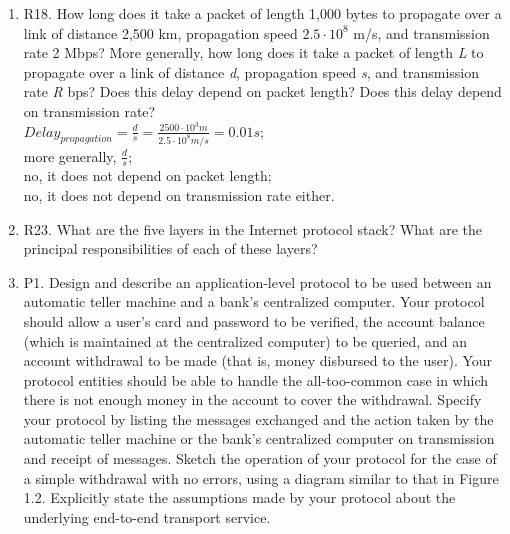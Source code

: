 \documentclass[12pt]{article}
\begin{document}
\begin{enumerate}
\item R18. How long does it take a packet of length 1,000 bytes to propagate over a link of distance 2,500 km, propagation speed \(2.5 \cdot10^8\) m/s, and transmission rate 2 Mbps? More generally, how long does it take a packet of length \textit{L} to propagate over a link of distance \textit{d}, propagation speed \textit{s}, and transmission rate \textit{R} bps? Does this delay depend on packet length? Does this delay depend on transmission rate?\\[1em]
\( Delay_{propagation} = \frac{d}{s}
= \frac{2500\cdot10^3m}{2.5\cdot10^8m/s}
=0.01s\);\\[0.25em] more generally, \(\frac{d}{s}\);\\[0.25em] no, it does not depend on packet length;\\ no, it does not depend on transmission rate either.
\item R23. What are the five layers in the Internet protocol stack? What are the principal responsibilities of each of these layers?
\begin{center}
\end{center}
\item P1. Design and describe an application-level protocol to be used between an automatic teller machine and a bank’s centralized computer. Your protocol should allow a user’s card and password to be verified, the account balance (which is maintained at the centralized computer) to be queried, and an account withdrawal to be made (that is, money disbursed to the user). Your protocol entities should be able to handle the all-too-common case in which there is not enough money in the account to cover the withdrawal. Specify your protocol by listing the messages exchanged and the action taken by the automatic teller machine or the bank’s centralized computer on transmission and receipt of messages. Sketch the operation of your protocol for the case of a simple withdrawal with no errors, using a diagram similar to that in Figure 1.2. Explicitly state the assumptions made by your protocol about the underlying end-to-end transport service.

\end{enumerate}
\end{document}
